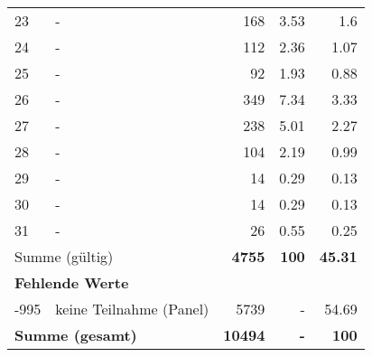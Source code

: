 \begin{longtable}{lXrrr}
        23 & \multicolumn{1}{X}{-} & %
          \num{168} &
          \num[round-mode=places,round-precision=2]{3.53} &
          \num[round-mode=places,round-precision=2]{1.6} \\

        24 & \multicolumn{1}{X}{-} & %
          \num{112} &
          \num[round-mode=places,round-precision=2]{2.36} &
          \num[round-mode=places,round-precision=2]{1.07} \\

        25 & \multicolumn{1}{X}{-} & %
          \num{92} &
          \num[round-mode=places,round-precision=2]{1.93} &
          \num[round-mode=places,round-precision=2]{0.88} \\

        26 & \multicolumn{1}{X}{-} & %
          \num{349} &
          \num[round-mode=places,round-precision=2]{7.34} &
          \num[round-mode=places,round-precision=2]{3.33} \\

        27 & \multicolumn{1}{X}{-} & %
          \num{238} &
          \num[round-mode=places,round-precision=2]{5.01} &
          \num[round-mode=places,round-precision=2]{2.27} \\

        28 & \multicolumn{1}{X}{-} & %
          \num{104} &
          \num[round-mode=places,round-precision=2]{2.19} &
          \num[round-mode=places,round-precision=2]{0.99} \\

        29 & \multicolumn{1}{X}{-} & %
          \num{14} &
          \num[round-mode=places,round-precision=2]{0.29} &
          \num[round-mode=places,round-precision=2]{0.13} \\

        30 & \multicolumn{1}{X}{-} & %
          \num{14} &
          \num[round-mode=places,round-precision=2]{0.29} &
          \num[round-mode=places,round-precision=2]{0.13} \\

        31 & \multicolumn{1}{X}{-} & %
          \num{26} &
          \num[round-mode=places,round-precision=2]{0.55} &
          \num[round-mode=places,round-precision=2]{0.25} \\

     \midrule
     \multicolumn{2}{l}{Summe (gültig)} &
       \textbf{\num{4755}} &
     \textbf{\num{100}} &
       \textbf{\num[round-mode=places,round-precision=2]{45.31}} \\
     \multicolumn{5}{l}{\textbf{Fehlende Werte}}\\
       -995 &
       keine Teilnahme (Panel) &
         \num{5739} &
        - &
         \num[round-mode=places,round-precision=2]{54.69} \\
     \midrule
     \multicolumn{2}{l}{\textbf{Summe (gesamt)}} &
          \textbf{\num{10494}} &
        \textbf{-} &
        \textbf{\num{100}} \\
     \bottomrule
     \end{longtable}
     
